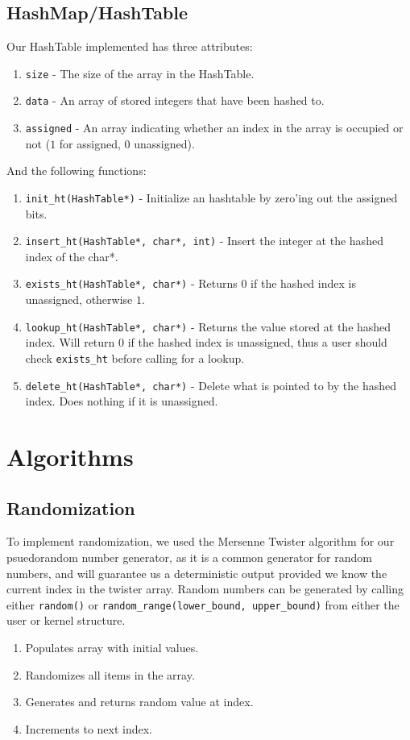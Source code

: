 \documentclass[12pt]{article}
\begin{document}
\subsection{HashMap/HashTable}
Our HashTable implemented has three attributes:
\begin{enumerate}
  \item \texttt{size} - The size of the array in the HashTable.
  \item \texttt{data} - An array of stored integers that have been hashed to.
  \item \texttt{assigned} - An array indicating whether an index in the array is occupied or not ($1$ for assigned, $0$ unassigned).
\end{enumerate}
And the following functions:
\begin{enumerate}
  \item \texttt{init\_ht(HashTable*)} - Initialize an hashtable by zero'ing out the assigned bits.
  \item \texttt{insert\_ht(HashTable*, char*, int)} - Insert the integer at the hashed index of the char*.
  \item \texttt{exists\_ht(HashTable*, char*)} - Returns $0$ if the hashed index is unassigned, otherwise $1$.
  \item \texttt{lookup\_ht(HashTable*, char*)} - Returns the value stored at the hashed index.  Will return $0$ if the hashed index is unassigned, thus a user should check \texttt{exists\_ht} before calling for a lookup.
  \item \texttt{delete\_ht(HashTable*, char*)} - Delete what is pointed to by the hashed index.  Does nothing if it is unassigned.
    \\[1\baselineskip]
\end{enumerate}

\section{Algorithms}
\subsection{Randomization}
To implement randomization, we used the Mersenne Twister algorithm for our psuedorandom number generator, as it is a common generator for random numbers, and will guarantee us a deterministic output provided we know the current index in the twister array.  Random numbers can be generated by calling either \texttt{random()} or \texttt{random\_range(lower\_bound, upper\_bound)} from either the user or kernel structure.
\begin{enumerate}
  \item Populates array with initial values.
  \item Randomizes all items in the array.
  \item Generates and returns random value at index.
  \item Increments to next index.
    \\[1\baselineskip]
\end{enumerate}
\end{document}

